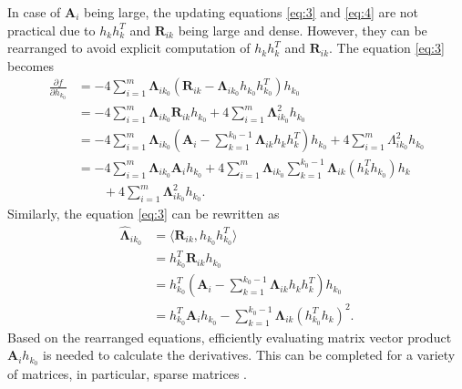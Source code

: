 \documentclass[10pt,journal,compsoc]{IEEEtran}
\newcommand{\bA}{\mathbf{A}}
\newcommand{\bR}{\mathbf{R}}
\newcommand{\bLambda}{\mathbf{\Lambda}}
\begin{document}
\noindent In case of $\bA_i$ being large, the updating equations \eqref{eq:3} and \eqref{eq:4} are not practical due to $h_k h_k^T$ and $\bR_{ik}$ being large and dense. However, they can be rearranged to avoid explicit computation of $h_k h_k^T$ and $\bR_{ik}$. The equation \eqref{eq:3} becomes
\begin{align*}
\frac{\partial f}{\partial h_{k_0}} &=-4\sum\limits_{i=1}^{m}  \bLambda_{ik_0} (\bR_{ik}-\bLambda_{ik_0} h_{k_0} h_{k_0}^T)  h_{k_0}\\
&=-4\sum\limits_{i=1}^{m}  \bLambda_{ik_0} \bR_{ik}  h_{k_0} + 4\sum\limits_{i=1}^{m}  \bLambda_{ik_0}^2  h_{k_0} \\
&=-4\sum\limits_{i=1}^{m}  \bLambda_{ik_0} (\bA_i - \sum\limits_{k=1}^{k_0-1} \bLambda_{ik}h_k h_k^T)  h_{k_0} + 4\sum\limits_{i=1}^{m}  \Lambda_{ik_0}^2  h_{k_0} \\
&=-4\sum\limits_{i=1}^{m}  \bLambda_{ik_0} \bA_i h_{k_0} + 4 \sum\limits_{i=1}^{m}  \bLambda_{ik_0} \sum\limits_{k=1}^{k_0-1}  \bLambda_{ik} (h_k^T h_{k_0}) h_k \\
&\qquad {}  + 4\sum\limits_{i=1}^{m}  \bLambda_{ik_0}^2  h_{k_0}.
\end{align*}
Similarly, the equation \eqref{eq:3} can be rewritten as
\begin{align*}  
\hat{\bLambda}_{i k_0} &= \langle \bR_{ik}, h_{k_0} h_{k_0}^T \rangle \\
&=  h_{k_0} ^T \bR_{ik} h_{k_0} \\
&= h_{k_0} ^T (\bA_i - \sum\limits_{k=1}^{k_0-1} \bLambda_{ik}h_k h_k^T) h_{k_0} \\
&= h_{k_0} ^T \bA_i h_{k_0} - \sum\limits_{k=1}^{k_0-1} \bLambda_{ik} (h_{k_0} ^T h_k)^2.
\end{align*}
Based on the rearranged equations, efficiently evaluating matrix vector product $\bA_i h_{k_0}$ is needed to calculate the derivatives. This can be completed for a variety of matrices, in particular, sparse matrices \cite{bell2009implementing}.  \\
\end{document}
